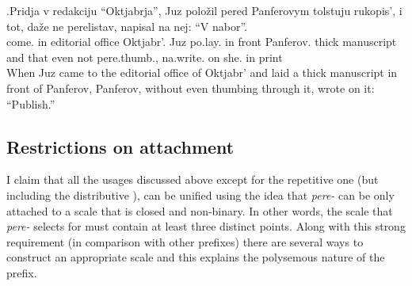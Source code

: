 \exg.\label{ex:perelistat}Pridja v redakciju ``Oktjabrja'', Juz polo\v{z}il pered Panferovym tolstuju rukopis', i tot, da\v{z}e ne perelistav, napisal na nej: ``V nabor''.\\
come. in {editorial office} Oktjabr'. Juz po.lay. {in front} Panferov. thick manuscript and that even not pere.thumb., na.write. on she. in 	print\\
\vspace{0.5em}
When Juz came to the editorial office of Oktjabr' and laid a thick manuscript in front of Panferov, Panferov, without even thumbing through it, wrote on it: ``Publish.''




\subsection{Restrictions on attachment}
I claim that all the usages discussed above except for the repetitive  one (but including the distributive ), can be unified using the idea that \textit{pere-}   can be only attached to a scale that is closed and non-binary. In other words, the scale that \textit{pere-}   selects for must contain at least three distinct points. Along with this strong requirement (in comparison  with other prefixes) there are several ways to construct an appropriate scale and this explains the polysemous nature of the prefix. 

